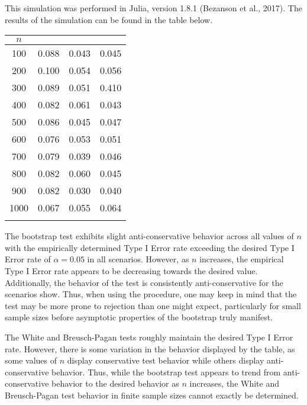 		This simulation was performed in Julia, version 1.8.1 (Bezanson et al., 2017). The results of the simulation can be found in the table below.

		\begin{table}[H]
			\centering
			\small\addtolength{\tabcolsep}{-3pt}
			\setlength\extrarowheight{-3pt}
			{
			\begin{tabular}{ c|c|c|c}
			$n$ & \vtop{\hbox{\strut Bootstrap}\hbox{\strut Test}} & \vtop{\hbox{\strut White}\hbox{\strut Test}} & \vtop{\hbox{\strut Breusch-Pagan} \hbox{\strut Test}} \\
			 \hline
			 100 & 0.088 & 0.043 & 0.045 \\
			 200 & 0.100 & 0.054 & 0.056 \\
			 300 & 0.089 & 0.051 & 0.410 \\
			 400 & 0.082 & 0.061 & 0.043 \\
			 500 & 0.086 & 0.045 & 0.047 \\
			 600 & 0.076 & 0.053 & 0.051 \\
			 700 & 0.079 & 0.039 & 0.046 \\
			 800 & 0.082 & 0.060 & 0.045 \\
			 900 & 0.082 & 0.030 & 0.040 \\
			 1000 & 0.067 & 0.055 & 0.064 \\
			 \Xhline{3\arrayrulewidth}
			\end{tabular}
			}
		\end{table}

		The bootstrap test exhibits slight anti-conservative behavior across all values of $n$ with the empirically determined Type I Error rate exceeding the desired Type I Error rate
		of $\alpha = 0.05$ in all scenarios. However, as $n$ increases, the empirical Type I Error rate appears to be decreasing towards the desired value. Additionally, the
		behavior of the test is consistently anti-conservative for the scenarios show. Thus, when using the procedure, one may keep in mind that the test may be more prone to
		rejection than one might expect, particularly for small sample sizes before asymptotic properties of the bootstrap truly manifest.

		The White and Breusch-Pagan tests roughly maintain the desired Type I Error rate. However, there is some variation in the behavior displayed by the table, as some values
		of $n$ display conservative test behavior while others display anti-conservative behavior. Thus, while the bootstrap test appears to trend from anti-conservative behavior
		to the desired behavior as $n$ increases, the White and Breusch-Pagan test behavior in finite sample sizes cannot exactly be determined.

